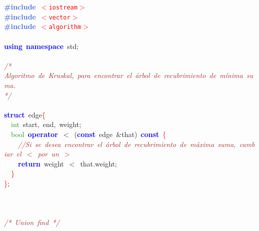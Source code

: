 
{\ttfamily \raggedright {
\noindent
\mbox{}\textbf{\textcolor{RoyalBlue}{\#include}}\ \texttt{\textcolor{Red}{$<$iostream$>$}} \\
\mbox{}\textbf{\textcolor{RoyalBlue}{\#include}}\ \texttt{\textcolor{Red}{$<$vector$>$}} \\
\mbox{}\textbf{\textcolor{RoyalBlue}{\#include}}\ \texttt{\textcolor{Red}{$<$algorithm$>$}} \\
\mbox{} \\
\mbox{}\textbf{\textcolor{Blue}{using}}\ \textbf{\textcolor{Blue}{namespace}}\ std\textcolor{BrickRed}{;} \\
\mbox{} \\
\mbox{}\textit{\textcolor{Brown}{/*}} \\
\mbox{}\textit{\textcolor{Brown}{Algoritmo\ de\ Kruskal,\ para\ encontrar\ el\ árbol\ de\ recubrimiento\ de\ mínima\ suma.}} \\
\mbox{}\textit{\textcolor{Brown}{*/}} \\
\mbox{} \\
\mbox{}\textbf{\textcolor{Blue}{struct}}\ edge\textcolor{Red}{\{} \\
\mbox{}\ \ \textcolor{ForestGreen}{int}\ start\textcolor{BrickRed}{,}\ end\textcolor{BrickRed}{,}\ weight\textcolor{BrickRed}{;} \\
\mbox{}\ \ \textcolor{ForestGreen}{bool}\ \textbf{\textcolor{Blue}{operator}}\ \textcolor{BrickRed}{$<$}\ \textcolor{BrickRed}{(}\textbf{\textcolor{Blue}{const}}\ edge\ \textcolor{BrickRed}{\&}that\textcolor{BrickRed}{)}\ \textbf{\textcolor{Blue}{const}}\ \textcolor{Red}{\{} \\
\mbox{}\ \ \ \ \textit{\textcolor{Brown}{//Si\ se\ desea\ encontrar\ el\ árbol\ de\ recubrimiento\ de\ máxima\ suma,\ cambiar\ el\ $<$\ por\ un\ $>$}} \\
\mbox{}\ \ \ \ \textbf{\textcolor{Blue}{return}}\ weight\ \textcolor{BrickRed}{$<$}\ that\textcolor{BrickRed}{.}weight\textcolor{BrickRed}{;} \\
\mbox{}\ \ \textcolor{Red}{\}} \\
\mbox{}\textcolor{Red}{\}}\textcolor{BrickRed}{;} \\
\mbox{} \\
\mbox{} \\
\mbox{} \\
\mbox{}\textit{\textcolor{Brown}{/*\ Union\ find\ */}} \\
}}
